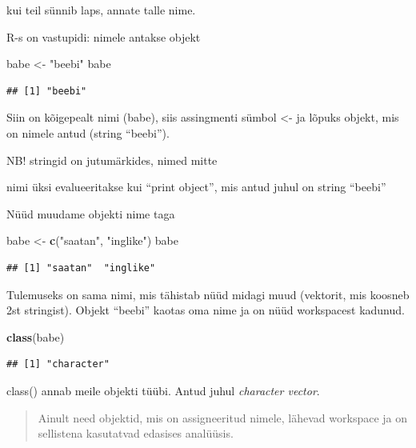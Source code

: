 \documentclass[]{book}
\newenvironment{Shaded}{\begin{snugshade}}{\end{snugshade}}
\newcommand{\KeywordTok}[1]{\textcolor[rgb]{0.13,0.29,0.53}{\textbf{#1}}}
\newcommand{\StringTok}[1]{\textcolor[rgb]{0.31,0.60,0.02}{#1}}
\newcommand{\NormalTok}[1]{#1}
\begin{document}
kui teil sünnib laps, annate talle nime.

R-s on vastupidi: nimele antakse objekt

\begin{Shaded}
\begin{Highlighting}[]
\NormalTok{babe <-}\StringTok{ "beebi"}
\NormalTok{babe}
\end{Highlighting}
\end{Shaded}

\begin{verbatim}
## [1] "beebi"
\end{verbatim}

Siin on kõigepealt nimi (babe), siis assingmenti sümbol \textless{}- ja
lõpuks objekt, mis on nimele antud (string ``beebi'').

NB! stringid on jutumärkides, nimed mitte

nimi üksi evalueeritakse kui ``print object'', mis antud juhul on string
``beebi''

Nüüd muudame objekti nime taga

\begin{Shaded}
\begin{Highlighting}[]
\NormalTok{babe <-}\StringTok{ }\KeywordTok{c}\NormalTok{(}\StringTok{"saatan"}\NormalTok{, }\StringTok{"inglike"}\NormalTok{)}
\NormalTok{babe}
\end{Highlighting}
\end{Shaded}

\begin{verbatim}
## [1] "saatan"  "inglike"
\end{verbatim}

Tulemuseks on sama nimi, mis tähistab nüüd midagi muud (vektorit, mis
koosneb 2st stringist). Objekt ``beebi'' kaotas oma nime ja on nüüd
workspacest kadunud.

\begin{Shaded}
\begin{Highlighting}[]
\KeywordTok{class}\NormalTok{(babe)}
\end{Highlighting}
\end{Shaded}

\begin{verbatim}
## [1] "character"
\end{verbatim}

class() annab meile objekti tüübi. Antud juhul \emph{character vector}.

\begin{quote}
Ainult need objektid, mis on assigneeritud nimele, lähevad workspace ja
on sellistena kasutatvad edasises analüüsis.
\end{quote}
\end{document}
